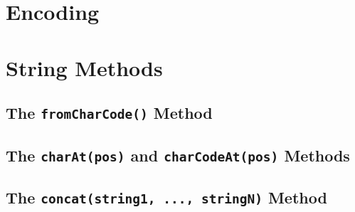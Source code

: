 \documentclass[11pt,letter]{book}
\begin{document}
    \section{Encoding}
    
    \section{String Methods}
    
    \subsection{The \texttt{fromCharCode()} Method}
    
    \subsection{The \texttt{charAt(pos)} and \texttt{charCodeAt(pos)} Methods}
    
    \subsection{The \texttt{concat(string1, ..., stringN)} Method}
    
\end{document}
